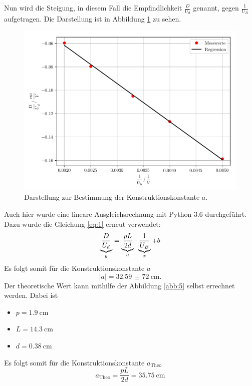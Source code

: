 Nun wird die Steigung, in diesem Fall die Empfindlichkeit $\frac{D}{U_d}$ genannt, gegen $\frac{1}{U_B}$ aufgetragen.
Die Darstellung ist in Abbildung \ref{abb:7} zu sehen.
\begin{figure}[H]
  \centering
  \includegraphics[width=\textwidth]{plot2.pdf}
  \caption{Darstellung zur Bestimmung der Konstruktionskonstante $a$.}
  \label{abb:7}
\end{figure}
Auch hier wurde eine lineare Ausgleichsrechnung mit Python 3.6 durchgeführt.
Dazu wurde die Gleichung \ref{eq:1} erneut verwendet:
\begin{equation*}
  \underbrace{\frac{D}{U_d}}_{\mathclap{y}} = \underbrace{\frac{pL}{2d}}_{\mathclap{a}} \cdot \underbrace{\frac{1}{U_B}}_{\mathclap{x}} + b
\end{equation*}
Es folgt somit für die Konstruktionskonstante $a$
\begin{equation*}
  |a| = \SI{32,59(72)}{\centi\meter}.
\end{equation*}
Der theoretische Wert kann mithilfe der Abbildung \ref{abb:5} selbst errechnet werden.
Dabei ist
\begin{itemize}
  \item $p = \SI{1.9}{\centi\meter}$
  \item $L = \SI{14.3}{\centi\meter}$
  \item $d = \SI{0.38}{\centi\meter}$
\end{itemize}
Es folgt somit für die Konstruktionskonstante $a_{\text{Theo}}$
\begin{equation*}
  a_{\text{Theo}} = \frac{pL}{2d} = \SI{35.75}{\centi\meter}
\end{equation*}

